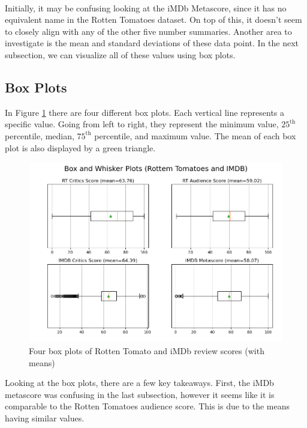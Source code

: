 \documentclass[12pt]{article}
\begin{document}
\quad \\

\noindent Initially, it may be confusing looking at the iMDb Metascore, since it has no equivalent name in the Rotten Tomatoes dataset. On top of this, it doesn't seem to closely align with any of the other five number summaries. Another area to investigate is the mean and standard deviations of these data point. In the next subsection, we can visualize all of these values using box plots.

\newpage

\subsection{Box Plots}
In Figure \ref{Figure 7} there are four different box plots. Each vertical line represents a specific value. Going from left to right, they represent the minimum value, $\text{25}^{\text{th}}$ percentile, median, $\text{75}^{\text{th}}$ percentile, and maximum value. The mean of each box plot is also displayed by a green triangle. \\ 

\begin{figure}[h]
\begin{center}
      \includegraphics[width=6.25in]{figure7.png}
      \caption{Four box plots of Rotten Tomato and iMDb review scores (with means)}
      \label{Figure 7}
\end{center}
\end{figure}

\noindent Looking at the box plots, there are a few key takeaways. First, the iMDb metascore was confusing in the last subsection, however it seems like it is comparable to the Rotten Tomatoes audience score. This is due to the means having similar values. \\
\end{document}

